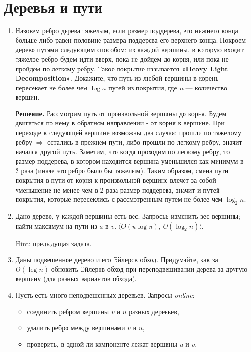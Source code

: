 \section*{Деревья и пути}
\begin{enumerate}
	\item Назовем ребро дерева тяжелым, если размер поддерева, его нижнего конца больше либо равен 
	половине размера поддерева его верхнего конца. Покроем дерево путями следующим способом: из 
	каждой вершины, в которую входит тяжелое ребро будем идти вверх, пока не дойдем до корня, 
	или пока не пройдем по легкому ребру. Такое покрытие называется 
	\textbf{«Heavy-Light-Decomposition»}. Докажите, что путь из любой вершины в корень пересекает 
	не более чем $\log n$ путей из покрытия, где $n$ — количество вершин.
	
	\textbf{Решение.} Рассмотрим путь от произвольной вершины до корня. Будем двигаться по нему 
	в обратном направлении - от корня к вершине. При переходе к следующей вершине возможны два 
	случая: прошли по тяжелому ребру $\Rightarrow$ остались в прежнем пути, либо прошли по 
	легкому ребру, значит начался другой путь. Заметим, что когда проходим по легкому ребру, то 
	размер поддерева, в котором находится вершина уменьшился как минимум в 2 раза (иначе это 
	ребро было бы тяжелым). Таким образом, смена пути покрытия в пути от корня к произвольной 
	вершине влечет за собой уменьшение не менее чем в 2 раза размер поддерева, значит и путей 
	покрытия, которые пересеклись с рассмотренным путем не более чем $\log_2 n$.
	
	\item Дано дерево, у каждой вершины есть вес. Запросы: 
	изменить вес вершины; 
	найти максимум на пути из $u$ в $v$. $\langle O(n \log n)$, $O(\log_2 n) \rangle$. 
	
	Hint: предыдущая задача.
	
	\item Даны подвешенное дерево и его Эйлеров обход. Придумайте, как за $O(\log n)$ обновить 
	Эйлеров	обход при переподвешивании дерева за другую вершину (для разных вариантов обхода).
	
	\item Пусть есть много неподвешенных деревьев. Запросы \textit{online}:
	\begin{itemize}
		\item соединить ребром вершины $v$ и $u$ разных деревьев,
		\item удалить ребро между вершинами $v$ и $u$,
		\item проверить, в одной ли компоненте лежат вершины $u$ и $v$.
	\end{itemize}


\end{enumerate}

